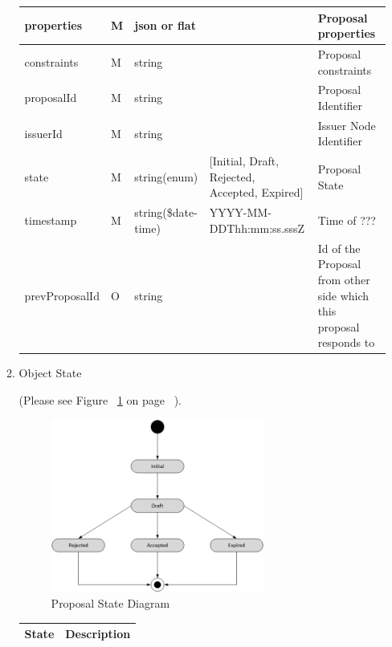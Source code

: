 \begin{enumerate}
\begin{enumerate}
\begin{center}
\begin{tabular}{|p{3cm}|l|p{3cm}|p{3cm}|p{4cm}|}
properties		& M	& 	json or flat		&												&	Proposal properties \\ 
\hline

constraints		& M	& 	string				&												&	Proposal constraints \\ 
\hline

proposalId		& M & 	string  			& 												& 	Proposal Identifier \\
\hline

issuerId		& M & 	string				&												& 	Issuer Node Identifier 	\\ 
\hline

state			& M & 	string(enum) 		& [Initial, Draft, Rejected, Accepted, Expired]	&  Proposal State	\\
\hline

timestamp		& M	& 	string(\$date-time)	& YYYY-MM-DDThh:mm:ss.sssZ						&	Time of ???  \\
\hline

prevProposalId 	& O & 	string				&												& 	Id of the Proposal from other side which this proposal responds to \\
\hline

\end{tabular}
\end{center}

\item Object State

(Please see Figure ~\ref{fig:PSD} on page ~\pageref{fig:PSD}).

\begin{figure}[htbp]
    \centering
    \includegraphics[width=7cm,angle=0]{./diag/Reference/ProposalState-Reference.png}
	\caption{Proposal State Diagram}
    \label{fig:PSD}
\end{figure}


\begin{center}
\begin{tabular}{|p{3cm}|p{11cm}|} 
\hline
\rowcolor{lightgray}	State	& 	Description \\
\hline


\end{tabular}
\end{center}
\end{enumerate}
\end{enumerate}
